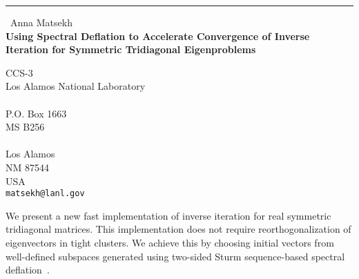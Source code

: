 \documentclass{report}
\begin{document}
\begin{center}
\rule{6in}{1pt} \
{\large Anna Matsekh \\
{\bf Using Spectral Deflation to Accelerate Convergence of Inverse Iteration for Symmetric Tridiagonal Eigenproblems}}

CCS-3 \\ Los Alamos National Laboratory \\ \\ P.O. Box 1663 \\ MS B256 \\  \\ Los Alamos \\ NM 87544 \\ USA
\\
{\tt matsekh@lanl.gov}\end{center}

We present a new fast implementation of inverse iteration for
real symmetric tridiagonal matrices. This implementation does not
require reorthogonalization of eigenvectors in tight clusters.
We achieve this by choosing initial vectors from well-defined
subspaces generated using two-sided Sturm sequence-based spectral
deflation~\cite{garant:eng}.
\end{document}
